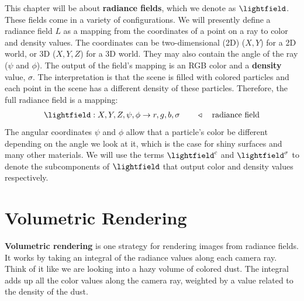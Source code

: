 This chapter will be about \textbf{radiance fields}, which we denote as $\lightfield$. These fields come in a variety of configurations. We will presently define a radiance field $L$ as a mapping from the coordinates of a point on a ray to color and density values. The coordinates can be two-dimensional (2D) ($X,Y$) for a 2D world, or 3D ($X,Y,Z$) for a 3D world. They may also contain the angle of the ray ($\psi$ and $\phi$). The output of the field's mapping is an RGB color and a \textbf{density} value, $\sigma$. The interpretation is that the scene is filled with colored particles and each point in the scene has a different density of these particles. Therefore, the full radiance field is a mapping:
\begin{align}
    \lightfield: X,Y,Z,\psi,\phi \rightarrow r,g,b,\sigma \quad\quad\triangleleft \quad\text{radiance field}
\end{align}
The angular coordinates $\psi$ and $\phi$ allow that a particle's color be different depending on the angle we look at it, which is the case for shiny surfaces and many other materials. We will use the terms $\lightfield^c$ and $\lightfield^\sigma$ to denote the subcomponents of $\lightfield$ that output color and density values respectively.




\section{Volumetric Rendering}
\textbf{Volumetric rendering} is one strategy for rendering images from radiance fields. It works by taking an integral of the radiance values along each camera ray. Think of it like we are looking into a hazy volume of colored dust. The integral adds up all the color values along the camera ray, weighted by a value related to the density of the dust.

